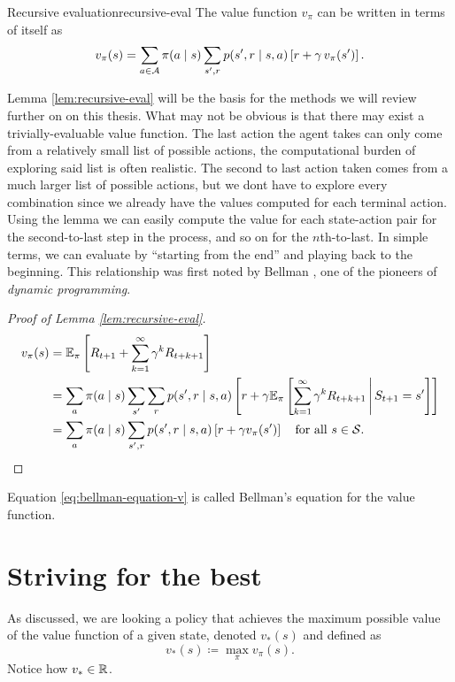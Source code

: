 \begin{lemma}{Recursive evaluation}{recursive-eval}
	The value function $v_\pi$ can be written in terms of itself as
	\begin{equation*}
		v_\pi (s) = \sum_{a \in \mathcal{A}} \pi(a \mid s) \sum_{s', r} p(s', r \mid s, a) \left[ r + \gamma \, v_\pi (s') \right].
	\end{equation*}
\end{lemma}

Lemma \ref{lem:recursive-eval} will be the basis for the methods we will review
further on on this thesis. What may not be obvious is that there may exist a
trivially-evaluable value function. The last action the agent takes can only
come from a relatively small list of possible actions, the computational burden
of exploring said list is often realistic. The second to last action taken comes
from a much larger list of possible actions, but we dont have to explore every
combination since we already have the values computed for each terminal action.
Using the lemma we can easily compute the value for each state-action pair for
the second-to-last step in the process, and so on for the $n$th-to-last. In
simple terms, we can evaluate by ``starting from the end'' and playing back to
the beginning. This relationship was first noted by Bellman \cite{bellman1957},
one of the pioneers of \textit{dynamic programming}.

\begin{proof}[Proof of Lemma \ref{lem:recursive-eval}]
	\begin{align}
		\label{eq:bellman-equation-v}
		v_\pi (s) &= \mathbb{E}_{\pi} \left[ R_{t+1} + \sum_{k=1}^{\infty} \gamma^{k} R_{t+k+1} \right] \nonumber \\
		&= \sum_a \pi(a \mid s) \sum_{s'} \sum_r p(s', r \mid s, a) \left[ r + \gamma \mathbb{E}_\pi \left[ \sum_{k=1}^{\infty} \gamma^{k} R_{{t+k+1}} \,\middle\vert\, S_{t+1} = s' \right] \right] \nonumber \\
		&= \sum_a \pi(a \mid s) \sum_{s', r} p(s', r \mid s, a) \left[ r + \gamma v_{\pi} (s') \right] \quad \text{for all } s \in \mathcal{S}.
	\end{align}
\end{proof}

Equation \eqref{eq:bellman-equation-v} is called Bellman's equation for the
value function.

\section{Striving for the best}
As discussed, we are looking a policy that achieves the maximum possible value
of the value function of a given state, denoted $v_*(s)$ and defined as
\begin{equation*}
	v_* (s) \coloneqq \max_{\pi} v_\pi (s).
\end{equation*}
Notice how $v_* \in \mathbb{R}$.

